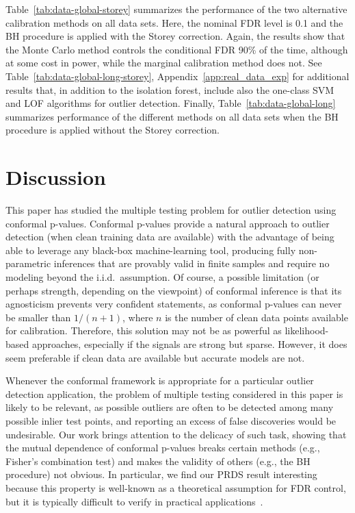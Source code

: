\documentclass[11pt]{article}
\begin{document}
 Table~\ref{tab:data-global-storey} summarizes the performance of the two alternative calibration methods on all data sets.
 Here, the nominal FDR level is 0.1 and the BH procedure is applied with the Storey correction. Again, the results show that the Monte Carlo method controls the conditional FDR 90\% of the time, although at some cost in power, while the marginal calibration method does not.
  See Table~\ref{tab:data-global-long-storey}, Appendix~\ref{app:real_data_exp} for additional results that, in addition to the isolation forest, include also the one-class SVM and LOF algorithms for outlier detection. Finally, Table~\ref{tab:data-global-long} summarizes performance of the different methods on all data sets when the BH procedure is applied without the Storey correction.

{\small
}

\section{Discussion} \label{sec:discussion}

This paper has studied the multiple testing problem for outlier detection using conformal p-values.
Conformal p-values provide a natural approach to outlier detection (when clean training data are available) with the advantage of being able to leverage any black-box machine-learning tool, producing fully non-parametric inferences that are provably valid in finite samples and require no modeling beyond the i.i.d.~assumption. Of course, a possible limitation (or perhaps strength, depending on the viewpoint) of conformal inference is that its agnosticism prevents very confident statements, as conformal p-values can never be smaller than $1/(n+1)$, where $n$ is the number of clean data points available for calibration. Therefore, this solution may not be as powerful as likelihood-based approaches, especially if the signals are strong but sparse.
However, it does seem preferable if clean data are available but accurate models are not.

Whenever the conformal framework is appropriate for a particular outlier detection application, the problem of multiple testing considered in this paper is likely to be relevant, as possible outliers are often to be detected among many possible inlier test points, and reporting an excess of false discoveries would be undesirable.
Our work brings attention to the delicacy of such task, showing that the mutual dependence of conformal p-values breaks certain methods (e.g., Fisher's combination test) and makes the validity of others (e.g., the BH procedure) not obvious.
In particular, we find our PRDS result interesting because this property is well-known as a theoretical assumption for FDR control, but it is typically difficult to verify in practical applications~\cite{benjamini2001control, clarke2009robustness}.
\end{document}
